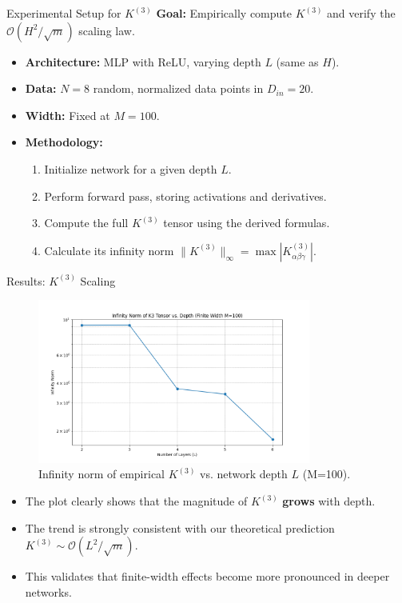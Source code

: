 \documentclass{beamer}
\newcommand{\Order}{\mathcal{O}}
\begin{document}
\begin{frame}{Experimental Setup for $K^{(3)}$}
\textbf{Goal:} Empirically compute $K^{(3)}$ and verify the $\Order(H^2/\sqrt{m})$ scaling law.
\begin{itemize}
    \item \textbf{Architecture:} MLP with ReLU, varying depth $L$ (same as $H$).
    \item \textbf{Data:} $N=8$ random, normalized data points in $D_{in}=20$.
    \item \textbf{Width:} Fixed at $M=100$.
    \item \textbf{Methodology:}
        \begin{enumerate}
            \item Initialize network for a given depth $L$.
            \item Perform forward pass, storing activations and derivatives.
            \item Compute the full $K^{(3)}$ tensor using the derived formulas.
            \item Calculate its infinity norm $\|K^{(3)}\|_\infty = \max |K^{(3)}_{\alpha\beta\gamma}|$.
        \end{enumerate}
\end{itemize}
\end{frame}

\begin{frame}{Results: $K^{(3)}$ Scaling}
\begin{figure}[h]
    \centering
    \includegraphics[width=0.8\textwidth]{../../../experiments/plots/k3_inf_norm_vs_L_finite_M100_N8_D20.png}
    \caption{Infinity norm of empirical $K^{(3)}$ vs. network depth $L$ (M=100).}
    \label{fig:k3_norm_vs_l}
\end{figure}
\begin{itemize}
    \item The plot clearly shows that the magnitude of $K^{(3)}$ \textbf{grows} with depth.
    \item The trend is strongly consistent with our theoretical prediction $K^{(3)} \sim \Order(L^2/\sqrt{m})$.
    \item This validates that finite-width effects become more pronounced in deeper networks.
\end{itemize}
\end{frame}
\end{document}
